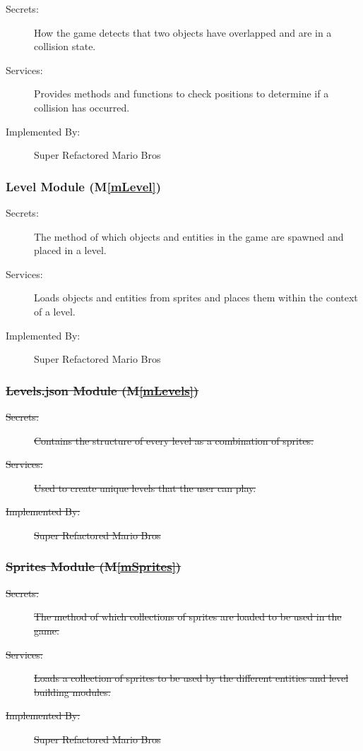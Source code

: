 \documentclass[12pt, titlepage]{article}
\newcommand{\mref}[1]{M\ref{#1}}
\begin{document}
\begin{description}
\item[Secrets:] How the game detects that two objects have overlapped and are in a collision state.
\item[Services:] Provides methods and functions to check positions to determine if a collision has occurred.
\item[Implemented By:] Super Refactored Mario Bros
\end{description}

\subsubsection{Level Module (\mref{mLevel})}

\begin{description}
\item[Secrets:] The method of which objects and entities in the game are spawned and placed in a level.
\item[Services:] Loads objects and entities from sprites and places them within the context of a level. 
\item[Implemented By:] Super Refactored Mario Bros
\end{description}

\subsubsection{\sout{Levels.json Module (\mref{mLevels})}}

\begin{description}
\item[\sout{Secrets:}] \sout{Contains the structure of every level as a combination of sprites.}
\item[\sout{Services:}] \sout{Used to create unique levels that the user can play.}
\item[\sout{Implemented By:}] \sout{Super Refactored Mario Bros}
\end{description}

\subsubsection{\sout{Sprites Module (\mref{mSprites})}}

\begin{description}
\item[\sout{Secrets:}] \sout{The method of which collections of sprites are loaded to be used in the game.}
\item[\sout{Services:}] \sout{Loads a collection of sprites to be used by the different entities and level building modules.}
\item[\sout{Implemented By:}] \sout{Super Refactored Mario Bros}
\end{description}
\end{document}
